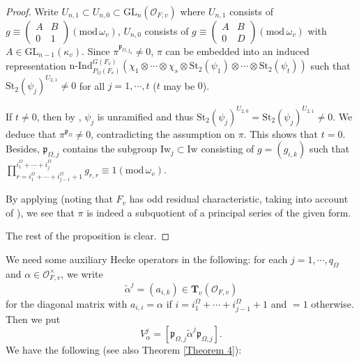 \documentclass[12pt,oneside,reqno]{amsart}
\theoremstyle{plain}
\begin{document}
	\begin{proof}
		Write
		$U_{n,1}\subset U_{n,0}
		\subset
		\mathrm{GL}_n(\mathcal{O}_{F,v})$
		where
		$U_{n,1}$
		consists of
		$g\equiv
		\begin{pmatrix}
			A & B \\
			0 & 1
		\end{pmatrix}
		(\mathrm{mod}\,\omega_v)$,	
		$U_{n,0}$
		consists of
		$g\equiv
		\begin{pmatrix}
			A & B \\
			0 & D
		\end{pmatrix}
		(\mathrm{mod}\,\omega_v)$
		with
		$A\in\mathrm{GL}_{n-1}(\kappa_v)$.
		Since
		$\pi^{\mathfrak{p}_{\Omega,j_0}}\ne0$,
		$\pi$
		can be embedded into an induced representation
		$\mathrm{n}\text{-}\mathrm{Ind}_{P_\Omega(F_v)}^{ G(F_v)}
		(
		\chi_1\otimes\cdots\otimes\chi_s\otimes
		\mathrm{St}_2(\psi_1)
		\otimes
		\cdots
		\otimes
		\mathrm{St}_2(\psi_t)
		)$
		such that
		$\mathrm{St}_2(\psi_j)^{U_{2,1}}\ne0$
		for all
		$j=1,\cdots,t$
		($t$ may be $0$).
		
		
		
		
		If $t\neq0$, then by
		\cite[p.90]{ClozelHarrisTaylor2008},
		$\psi_j$ is unramified and
		thus
		$\mathrm{St}_2(\psi_j)^{U_{2,0}}=
		\mathrm{St}_2(\psi_j)^{U_{2,1}}\ne0$.
		We deduce that
		$\pi^{\mathfrak{p}_\Omega}\ne0$,
		contradicting the assumption on
		$\pi$.
		This shows that
		$t=0$.
		Besides,
		$\mathfrak{p}_{\Omega,j}$
		contains the subgroup
		$\mathrm{Iw}_j\subset\mathrm{Iw}$
		consisting of
		$g=(g_{i,k})$
		such that
		$\prod_{
			r=i^\Omega_1+\cdots+i^\Omega_{j-1}+1
		}^{i^\Omega_1+\cdots+i^\Omega_{j}}g_{r,r}
		\equiv
		1(\mathrm{mod}\,\omega_v)$.
		
		
		
		
		
		By applying
		\cite[Theorem 7.7]{Roche1998}
		(noting that $F_v$ has odd residual characteristic,
		taking into account of \cite[Remark 4.14]{Roche1998}),
		we see that
		$\pi$
		is indeed a subquotient of a principal series of the given form.
		
		
		
		
		
		The rest of the proposition
		is clear.
	\end{proof}
	
	
	
	
	
	We need some auxiliary Hecke operators
	in the following:
	for each
	$j=1,\cdots,q_\Omega$
	and
	$\alpha\in
	\mathcal{O}_{F,v}^\times$,
	we write
	\[
	\widetilde{\alpha}^j=(a_{i,k})\in
	\mathbf{T}_v(\mathcal{O}_{F,v})
	\]
	for the diagonal matrix
	with $a_{i,i}=\alpha$
	if $i=i^\Omega_1+\cdots+i^\Omega_{j-1}+1$
	and
	$=1$ otherwise.
	Then we put
	\[
	V^j_\alpha=
	[\mathfrak{p}_{\Omega,j}\widetilde{\alpha}^j
	\mathfrak{p}_{\Omega,j}].
	\]
	We have the following (see also Theorem \ref{Theorem 4}):
	
\end{document}
